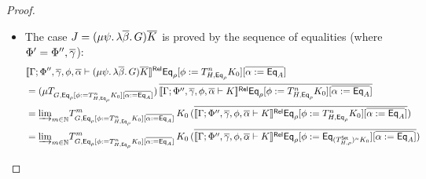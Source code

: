 \documentclass[acmsmall,review,anonymous]{acmart}
\theoremstyle{definition}
\newcommand{\set}{\mathsf{Set}}
\begin{document}
\begin{proof}
\begin{itemize}
\begin{itemize}
\item 
  The case $J = (\mu \psi.\, \lambda \overline{\beta}.\, G) \overline{K}$
is proved by the sequence of equalities (where $\Phi' = \Phi'', \overline{\gamma}$):
\[
\begin{split}
& \relsem{\Gamma; \Phi'', \ol\gamma, \phi, \ol{\alpha} \vdash (\mu \psi.\, \lambda \ol{\beta}.\, G) \ol{K}}
  \Eq_{\rho} [\phi := T^{n}_{H,\Eq_{\rho}} K_0]
  [\overline{\alpha := \Eq_A}] \\
&= (\mu {T_{G, \Eq_{\rho}[\phi := T^{n}_{H,\Eq_{\rho}} K_0][\overline{\alpha := \Eq_A}]}})
  \,\ol{\relsem{\Gamma; \Phi'', \ol\gamma, \phi, \ol{\alpha} \vdash K}\Eq_{\rho}
  [\phi := T^{n}_{H,\Eq_{\rho}} K_0][\overline{\alpha := \Eq_A}]} \\ 
&= \colim{m \in \nat} {T^m_{G, \Eq_{\rho}[\phi := T^{n}_{H,\Eq_{\rho}} K_0][\overline{\alpha := \Eq_A}]}}\,K_0
  \,(\ol{\relsem{\Gamma; \Phi'', \ol\gamma, \phi, \ol{\alpha} \vdash K}\Eq_{\rho}
  [\phi := T^{n}_{H,\Eq_{\rho}} K_0][\overline{\alpha := \Eq_A}]}) \\ 
&= \colim{m \in \nat} {T^m_{G, \Eq_{\rho}[\phi := T^{n}_{H,\Eq_{\rho}} K_0][\overline{\alpha := \Eq_A}]}}\,K_0
  \,(\ol{\relsem{\Gamma; \Phi'', \ol\gamma, \phi, \ol{\alpha} \vdash K}\Eq_{\rho}
  [\phi := \Eq_{(T^{\set}_{H,\rho})^n K_0}][\overline{\alpha := \Eq_A}]}) \\  %

\end{split}\]
\end{itemize}
\end{itemize}
\end{proof}
\end{document}
